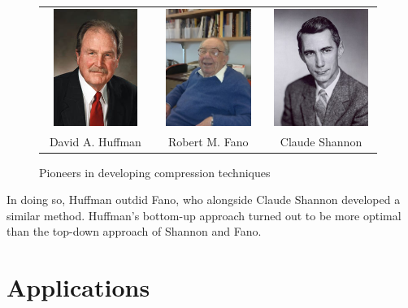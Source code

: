 \documentclass[18pt]{article}
\begin{document}
	\begin{center}
		\begin{figure}[h]
			\centering
			\begin{tabular}{c c c}
				\includegraphics[height = 1.5in, width = 1.3in]{images/huffman.jpg} & 
				\includegraphics[height = 1.5in, width = 1.3in]{images/fano.jpg} & 
				\includegraphics[height = 1.5in, width = 1.3in]{images/shannon.jpg} \\
				\scriptsize{David A. Huffman} & \scriptsize{Robert M. Fano} & \scriptsize{Claude Shannon} \\
			\end{tabular} 
			\caption{Pioneers in developing compression techniques}
		\end{figure}   
	\end{center}
	
	In doing so, Huffman outdid Fano, who alongside Claude Shannon developed
	a similar method. Huffman’s bottom-up approach turned out to be more
	optimal than the top-down approach of Shannon and Fano.
	
	\newpage
	
	\section{Applications}
	
\end{document}
